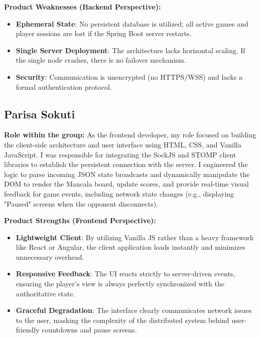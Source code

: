 \documentclass{scrartcl}
\begin{document}
\textbf{Product Weaknesses (Backend Perspective):}
\begin{itemize}
  \item \textbf{Ephemeral State}: No persistent database is utilized; all active games and player sessions are lost if the Spring Boot server restarts.
  \item \textbf{Single Server Deployment}: The architecture lacks horizontal scaling. If the single node crashes, there is no failover mechanism.
  \item \textbf{Security}: Communication is unencrypted (no HTTPS/WSS) and lacks a formal authentication protocol.
\end{itemize}

\subsection{Parisa Sokuti}

\textbf{Role within the group:}
As the frontend developer, my role focused on building the client-side architecture and user interface using HTML, CSS, and Vanilla JavaScript. I was responsible for integrating the SockJS and STOMP client libraries to establish the persistent connection with the server. I engineered the logic to parse incoming JSON state broadcasts and dynamically manipulate the DOM to render the Mancala board, update scores, and provide real-time visual feedback for game events, including network state changes (e.g., displaying "Paused" screens when the opponent disconnects).

\textbf{Product Strengths (Frontend Perspective):}
\begin{itemize}
  \item \textbf{Lightweight Client}: By utilizing Vanilla JS rather than a heavy framework like React or Angular, the client application loads instantly and minimizes unnecessary overhead.
  \item \textbf{Responsive Feedback}: The UI reacts strictly to server-driven events, ensuring the player's view is always perfectly synchronized with the authoritative state.
  \item \textbf{Graceful Degradation}: The interface clearly communicates network issues to the user, masking the complexity of the distributed system behind user-friendly countdowns and pause screens.
\end{itemize}
\end{document}
